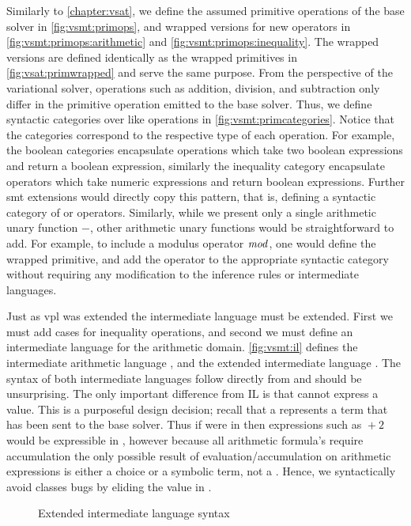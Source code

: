 Similarly to \autoref{chapter:vsat}, we define the assumed primitive operations
of the base solver in \autoref{fig:vsmt:primops}, and wrapped versions for new
operators in \autoref{fig:vsmt:primops:arithmetic} and
\autoref{fig:vsmt:primops:inequality}. The wrapped versions are defined
identically as the wrapped primitives in \autoref{fig:vsat:primwrapped} and
serve the same purpose.
%
From the perspective of the variational solver, operations such as addition,
division, and subtraction only differ in the primitive operation emitted to the
base solver. Thus, we define syntactic categories over like operations in
\autoref{fig:vsmt:primcategories}. Notice that the categories correspond to the
respective type of each operation. For example, the boolean categories
encapsulate operations which take two boolean expressions and return a boolean
expression, similarly the inequality category encapsulate operators which take
numeric expressions and return boolean expressions. Further \ac{smt} extensions
would directly copy this pattern, that is, defining a syntactic category of
 or  operators. Similarly, while we present
only a single arithmetic unary function $-$, other arithmetic unary functions
would be straightforward to add. For example, to include a modulus operator
$\mathit{mod}$, one would define the wrapped primitive, and add the operator to the
appropriate syntactic category without requiring any modification to the
inference rules or intermediate languages.

Just as \ac{vpl} was extended the intermediate language must be extended. First
we must add cases for inequality operations, and second we must define an
intermediate language for the arithmetic domain.
%
\autoref{fig:vsmt:il} defines the intermediate arithmetic language \eAR, and the
extended intermediate language \eIL. The syntax of both intermediate languages
follow directly from \evpl and should be unsurprising. The only important
difference from IL is that \eAR cannot express a \unit{} value. This is a
purposeful design decision; recall that a \unit{} represents a term that has
been sent to the base solver. Thus if \unit{} were in \eAR then expressions such
as $\unit{} + 2$ would be expressible in \eAR, however because all arithmetic
formula's require accumulation the only possible result of
evaluation/accumulation on arithmetic expressions is either a choice or a
symbolic term, not a \unit{}. Hence, we syntactically avoid classes bugs by
eliding the \unit{} value in \eAR.
% 
\begin{figure}
  
  \caption{Extended intermediate language syntax}%
  \label{fig:vsmt:il}
\end{figure}

